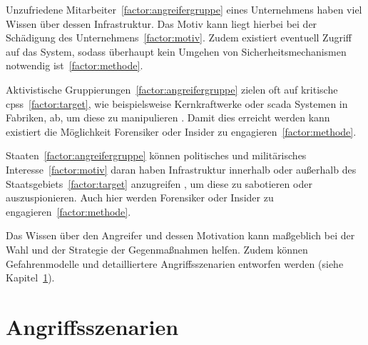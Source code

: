 \documentclass[final,bibliography=totocnumbered]{include/sikseminar}
\newcommand{\cps}{\glspl{cps}\xspace}
\begin{document}
Unzufriedene Mitarbeiter~\ref{factor:angreifergruppe} eines Unternehmens haben viel Wissen über dessen Infrastruktur.
Das Motiv kann liegt hierbei bei der Schädigung des Unternehmens~\ref{factor:motiv}.
Zudem existiert eventuell Zugriff auf das System, sodass überhaupt kein Umgehen von Sicherheitsmechanismen notwendig ist~\ref{factor:methode}.~\cite{CAS+09,WYX+10}

Aktivistische Gruppierungen~\ref{factor:angreifergruppe} zielen oft auf kritische \cps~\ref{factor:target}, wie beispielsweise Kernkraftwerke oder \gls{scada} Systemen in Fabriken, ab, um diese zu manipulieren \cite{CAS+09,HLL+17}. 
Damit dies erreicht werden kann existiert die Möglichkeit Forensiker oder Insider zu engagieren~\ref{factor:methode}.~\cite{WYX+10}

Staaten~\ref{factor:angreifergruppe} können politisches und militärisches Interesse~\ref{factor:motiv} daran haben Infrastruktur innerhalb oder außerhalb des Staatsgebiets~\ref{factor:target} anzugreifen \cite{CAS+09}, um diese zu sabotieren oder auszuspionieren.
Auch hier werden Forensiker oder Insider zu engagieren~\ref{factor:methode}.

Das Wissen über den Angreifer und dessen Motivation kann maßgeblich bei der Wahl und der Strategie der Gegenmaßnahmen helfen.
Zudem können Gefahrenmodelle und detailliertere Angriffsszenarien entworfen werden (siehe Kapitel~\ref{sec:angriffszenarien}).


\section{Angriffsszenarien}\label{sec:angriffszenarien}
\end{document}
